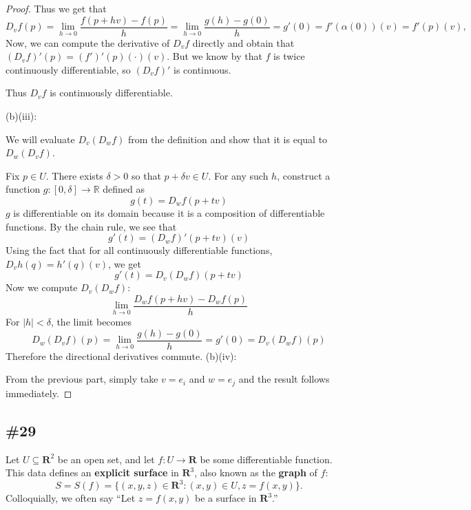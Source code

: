 \documentclass{article}
\newcommand{\R}{\mathbf{R}}
\theoremstyle{plain} %
\numberwithin{thm}{section} %
\theoremstyle{definition}
\begin{document}
\begin{proof}
            Thus we get that
            \[
                D_v f(p) = \lim_{h \to 0} \frac{f(p + hv) - f(p)}{h} = \lim_{h \to 0} \frac{g(h) - g(0)}{h} = g'(0) = f'(\alpha (0))(v) = f'(p)(v),
            \]
            Now, we can compute the derivative of \(D_{v} f\) directly and obtain that \((D_v f)'(p) = (f')'(p)(\cdot)(v)\). But we know by that \(f\) is twice continuously differentiable, so \((D_v f)'\) is continuous.

            Thus \(D_v f\) is continuously differentiable.
            \medskip

            (b)(iii):

            We will evaluate \(D_v (D_w f)\) from the definition and show that it is equal to \(D_w (D_v f)\).

            Fix \(p \in U\). There exists \(\delta > 0\) so that \(p + \delta v \in U\). For any such \(h\), construct a function \(g : [0,\delta] \to \mathbb{R}\) defined as
            \[
                g(t) = D_w f(p + tv)
            \]
            \(g\) is differentiable on its domain because it is a composition of differentiable functions. By the chain rule, we see that
            \[
                g'(t) = (D_w f)'(p+tv)(v)
            \]
            Using the fact that for all continuously differentiable functions, \(D_v h (q) = h'(q)(v)\), we get
            \[
                g'(t) = D_v (D_w f) (p+tv)
            \]
            Now we compute \(D_v (D_w f)\):
            \[
                \lim_{h \to 0} \frac{D_w f(p+hv) - D_w f(p)}{h}
            \]
            For \(|h| < \delta\), the limit becomes
            \[
                D_w (D_v f) (p) = \lim_{h \to 0} \frac{g(h) - g(0)}{h} = g'(0) = D_v (D_w f) (p)
            \]
            Therefore the directional derivatives commute.
            \medbreak
            (b)(iv):

            From the previous part, simply take \(v = e_i\) and \(w = e_j\) and the result follows immediately.
        \end{proof}

        \subsection{\#29}

        Let $U\subseteq \R^2$ be an open set, and let $f:U\rightarrow \R$ be some differentiable function. This data defines an \textbf{explicit surface} in $\R^3$, also known as the \textbf{graph} of $f$:
        \[ S = S(f) = \{(x,y,z)\in \R^3 : (x,y)\in U, z=f(x,y)\}. \]
        Colloquially, we often say ``Let $z=f(x,y)$ be a surface in $\R^3$.''
        
\end{document}
